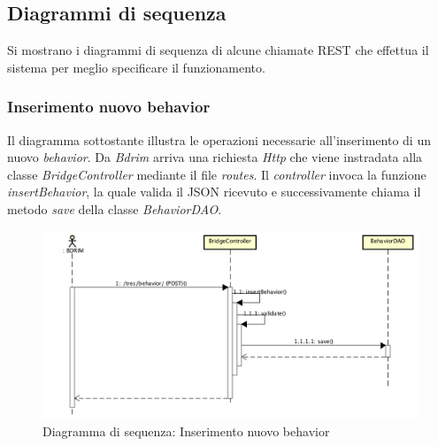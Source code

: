 \subsection{Diagrammi di sequenza}
Si mostrano i diagrammi di sequenza di alcune chiamate \gls{REST} che effettua il sistema per meglio specificare il funzionamento.
\subsubsection*{Inserimento nuovo behavior}
Il diagramma sottostante illustra le operazioni necessarie all'inserimento di un nuovo \textit{behavior}. Da \textit{Bdrim} arriva una richiesta \textit{Http} che viene instradata alla classe \textit{BridgeController} mediante il file \textit{routes}. Il \textit{controller} invoca la funzione \textit{insertBehavior}, la quale valida il \gls{JSON} ricevuto e successivamente chiama il metodo \textit{save} della classe \textit{BehaviorDAO}.
\begin{figure}[h]
\centering
\includegraphics[width=0.9\linewidth]{immagini/sequenzaSalvabehavior}
\caption[Diagramma di sequenza: Inserimento nuovo behavior]{Diagramma di sequenza: Inserimento nuovo behavior}
\label{fig:sequenzaSalvabehavior}
\end{figure}

\newpage
